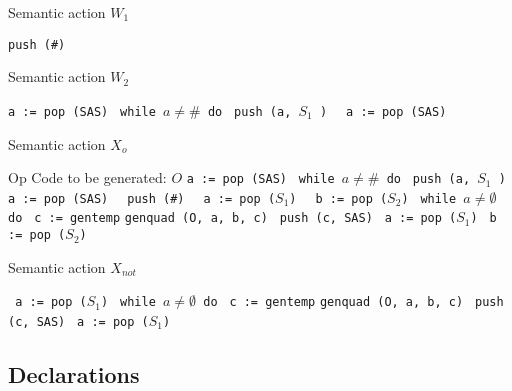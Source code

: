 \documentclass[11pt]{article}
\begin{document}
\begin {algorithm}
\caption{ Semantic action $W_1$}
\label{alg:w1}
\begin{algorithmic}
\STATE \texttt {push (\#)}
\end{algorithmic}
\end{algorithm}

\begin {algorithm}
\caption{ Semantic action $W_2$}
\label{alg:W2}
\begin{algorithmic}
\STATE \texttt {a := pop (SAS) }
\STATE \texttt {while $a \neq \# $ do }
\STATE \hspace {0.5 cm}  \texttt {push (a, $S_1$ ) }
\STATE \hspace {0.5 cm} \texttt { a := pop (SAS) }
\end{algorithmic}
\end{algorithm}

\begin {algorithm}
\caption{ Semantic action $X_o$}
\label{alg:wo}
\begin{algorithmic}
\REQUIRE Op Code to be generated: $O$
\STATE \texttt {a := pop (SAS) }
\STATE \texttt {while $a \neq \# $ do }
\STATE \hspace {0.5 cm}  \texttt {push (a, $S_1$ ) }
\STATE \hspace {0.5 cm} \texttt {a := pop (SAS) }
\STATE \texttt { push (\#)  }
\STATE \texttt { a := pop ($S_1$) } 
\STATE \texttt { b := pop ($S_2$) } 
\STATE \texttt {while $a \neq \emptyset $ do }
\STATE \hspace {0.5 cm} \texttt {c := gentemp}
\STATE \hspace {0.5 cm} \texttt {genquad (O, a, b, c) }
\STATE  \hspace {0.5 cm} \texttt {push (c, SAS) } 
\STATE  \hspace {0.5 cm} \texttt {a := pop ($S_1$) } 
\STATE  \hspace {0.5 cm} \texttt {b := pop ($S_2$) } 

\end{algorithmic}
\end{algorithm}

\begin {algorithm}
\caption{ Semantic action $X_{not}$}
\label{alg:xnot}
\begin{algorithmic}
\STATE \texttt { a := pop ($S_1$) } 
\STATE \texttt {while $a \neq \emptyset $ do }
\STATE \hspace {0.5 cm} \texttt {c := gentemp}
\STATE \hspace {0.5 cm} \texttt {genquad (O, a, b, c) }
\STATE  \hspace {0.5 cm} \texttt {push (c, SAS) } 
\STATE  \hspace {0.5 cm} \texttt {a := pop ($S_1$) } 

\end{algorithmic}
\end{algorithm}

\newpage
\subsection {Declarations}
\end{document}
